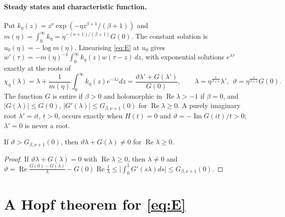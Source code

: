 \documentclass[11pt,a4paper]{report}
\newcommand{\vth}{\vartheta}
\begin{document}
\paragraph{Steady states and characteristic function.} Put $k_\eta(z)=z^\nu\exp(-\eta z^{\beta+1}/(\beta+1))$ and $m(\eta)=\int_0^\infty k_\eta=\eta^{-(\nu+1)/(\beta+1)}G(0)$. The constant solution is $u_0(\eta)=-\log m(\eta)$. Linearising \eqref{eq:E} at $u_0$ gives $w'(\tau)=-m(\eta)^{-1}\int_0^\infty k_\eta(z)w(\tau-z)\,dz$, with exponential solutions $e^{\lambda\tau}$ exactly at the roots of
\begin{equation}\label{eq:char}
\chi_\eta(\lambda)=\lambda+\frac{1}{m(\eta)}\int_0^\infty k_\eta(z)e^{-\lambda z}dz
=\frac{\vth\lambda'+G(\lambda')}{G(0)},\qquad
\lambda=\eta^{\frac1{\beta+1}}\lambda',\ \ \vth=\eta^{\frac1{\beta+1}}G(0).
\end{equation}
The function $G$ is entire if $\beta>0$ and holomorphic in $\operatorname{Re}\lambda>-1$ if $\beta=0$, and $|G(\lambda)|\le G(0)$, $|G'(\lambda)|\le G_{\beta,\nu+1}(0)$ for $\operatorname{Re}\lambda\ge0$. A purely imaginary root $\lambda'=it$, $t>0$, occurs exactly when $H(t)=0$ and $\vth=-\operatorname{Im}G(it)/t>0$; $\lambda'=0$ is never a root.

\begin{lemma}[source, \S3.1]\label{lem:large}
If $\vth>G_{\beta,\nu+1}(0)$, then $\vth\lambda+G(\lambda)\neq0$ for $\operatorname{Re}\lambda\ge0$.
\end{lemma}
\begin{proof}
If $\vth\lambda+G(\lambda)=0$ with $\operatorname{Re}\lambda\ge0$, then $\lambda\ne0$ and $\vth=\operatorname{Re}\frac{G(0)-G(\lambda)}{\lambda}-G(0)\operatorname{Re}\frac1\lambda\le\bigl|\int_0^1G'(s\lambda)ds\bigr|\le G_{\beta,\nu+1}(0)$.
\end{proof}

\section{A Hopf theorem for \texorpdfstring{\eqref{eq:E}}{(E)}}\label{sec:hopf}
\end{document}
